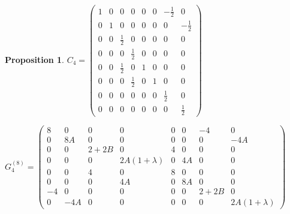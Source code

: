 \documentclass{amsart}
\theoremstyle{plain}
\newtheorem{proposition}[theorem]{Proposition}
\theoremstyle{definition}
\theoremstyle{remark}
\numberwithin{equation}{section}
\begin{document}
\begin{proposition}
\vspace{0.5cm}
\begin{minipage}[t]{0.38\textwidth}
    \vspace{5pt}
    { %
    $C_4 = 
    \begin{pmatrix}
    1 & 0 & 0 & 0 & 0 & 0 & -\frac{1}{2} & 0 \\
    0 & 1 & 0 & 0 & 0 & 0 & 0 & -\frac{1}{2} \\
    0 & 0 & \frac{1}{2} & 0 & 0 & 0 & 0 & 0 \\
    0 & 0 & 0 & \frac{1}{2} & 0 & 0 & 0 & 0 \\
    0 & 0 & \frac{1}{2} & 0 & 1 & 0 & 0 & 0 \\
    0 & 0 & 0 & \frac{1}{2} & 0 & 1 & 0 & 0 \\
    0 & 0 & 0 & 0 & 0 & 0 & \frac{1}{2} & 0 \\
    0 & 0 & 0 & 0 & 0 & 0 & 0 & \frac{1}{2} 
    \end{pmatrix}
    $
    }
\end{minipage}
\hfill
\begin{minipage}[t]{0.62\textwidth}
    \vspace{5pt}
    { %
    $G_{4}^{(8)} = 
    \begin{pmatrix}
    8 & 0 & 0 & 0 & 0 & 0 & -4 & 0 \\
    0 & 8A & 0 & 0 & 0 & 0 & 0 & -4A \\
    0 & 0 & 2+2B & 0 & 4 & 0 & 0 & 0 \\
    0 & 0 & 0 & 2A(1+\lambda) & 0 & 4A & 0 & 0 \\
    0 & 0 & 4 & 0 & 8 & 0 & 0 & 0 \\
    0 & 0 & 0 & 4A & 0 & 8A & 0 & 0 \\
    -4 & 0 & 0 & 0 & 0 & 0 & 2+2B & 0 \\
    0 & -4A & 0 & 0 & 0 & 0 & 0 & 2A(1+\lambda)
    \end{pmatrix}
    $
    }
\end{minipage}


\end{proposition}
\end{document}
